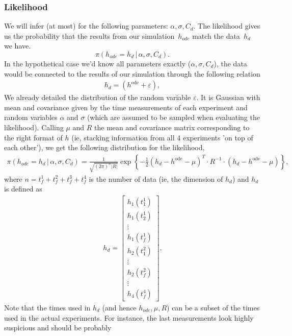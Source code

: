 \documentclass{article}
\begin{document}
\subsubsection*{Likelihood}

We will infer (at most) for the following parameters: $\alpha,\sigma,C_{d}$.
The likelihood gives us the probability that the results from our
simulation~$h_{ode}$ match the data~$h_{d}$ we have. 
\[
\pi\left(h_{ode}=h_{d}\,|\,\alpha,\sigma,C_{d}\right).
\]
 In the hypothetical case we'd know all parameters exactly ($\alpha,\sigma,C_{d}$),
the data would be connected to the results of our simulation through
the following relation 
\begin{align*}
h_{d}=\left(h^{\text{ode}}+\varepsilon\right),
\end{align*}
We already detailed the distribution of the random variable $\varepsilon$.
It is Gaussian with mean and covariance given by the time measurements
of each experiment and random variables $\alpha$ and $\sigma$ (which
are assumed to be sampled when evaluating the likelihood). Calling
$\mu$ and $R$ the mean and covariance matrix corresponding to the
right format of $h$ (ie, stacking information from all 4 experiments
'on top of each other'), we get the following distribution for the
likelihood, 
\begin{align*}
\pi(h_{ode}=h_{d}\,|\,\alpha,\sigma,C_{d})=\frac{1}{\sqrt{(2\pi)^{n}|R|}}\exp\left\{ -\frac{1}{2}\left(h_{d}-h^{\text{ode}}-\mu\right)^{T}\cdotp R^{-1}\cdotp\left(h_{d}-h^{\text{ode}}-\mu\right)\right\} ,
\end{align*}
 where $n=t_{f}^{1}+t_{f}^{2}+t_{f}^{3}+t_{f}^{4}$ is the number
of data (ie, the dimension of $h_{d}$) and $h_{d}$ is defined as
\begin{align*}
h_{d}=\begin{bmatrix}h_{1}(t_{1}^{1})\\
h_{1}(t_{2}^{1})\\
\vdots\\
h_{1}(t_{f}^{1})\\
h_{2}(t_{1}^{2})\\
\vdots\\
h_{2}(t_{f}^{2})\\
\vdots\\
h_{4}(t_{f}^{4})
\end{bmatrix}.
\end{align*}
 Note that the times used in $h_{d}$ (and hence $h_{ode},\mu,R$)
can be a subset of the times used in the actual experiments. For instance,
the last measurements look highly suspicious and should be probably
\end{document}
